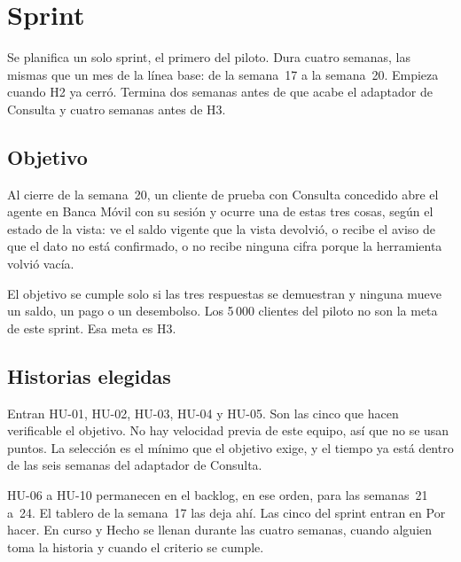 \documentclass[11pt,a4paper]{article}
\begin{document}
\section{Sprint}

Se planifica un solo sprint, el primero del piloto. Dura cuatro semanas, las mismas que un mes de la línea base: de la semana~17 a la semana~20. Empieza cuando H2 ya cerró. Termina dos semanas antes de que acabe el adaptador de Consulta y cuatro semanas antes de H3.

\subsection{Objetivo}

Al cierre de la semana~20, un cliente de prueba con Consulta concedido abre el agente en Banca Móvil con su sesión y ocurre una de estas tres cosas, según el estado de la vista: ve el saldo vigente que la vista devolvió, o recibe el aviso de que el dato no está confirmado, o no recibe ninguna cifra porque la herramienta volvió vacía.

El objetivo se cumple solo si las tres respuestas se demuestran y ninguna mueve un saldo, un pago o un desembolso. Los 5\,000 clientes del piloto no son la meta de este sprint. Esa meta es H3.

\subsection{Historias elegidas}

Entran HU-01, HU-02, HU-03, HU-04 y HU-05. Son las cinco que hacen verificable el objetivo. No hay velocidad previa de este equipo, así que no se usan puntos. La selección es el mínimo que el objetivo exige, y el tiempo ya está dentro de las seis semanas del adaptador de Consulta.

HU-06 a HU-10 permanecen en el backlog, en ese orden, para las semanas~21 a~24. El tablero de la semana~17 las deja ahí. Las cinco del sprint entran en Por hacer. En curso y Hecho se llenan durante las cuatro semanas, cuando alguien toma la historia y cuando el criterio se cumple.
\end{document}
